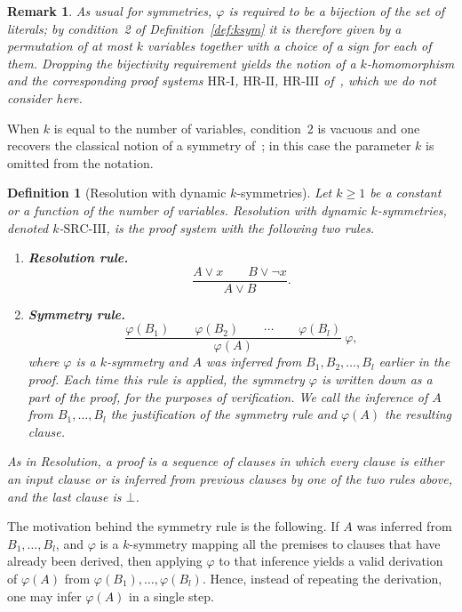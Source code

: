 \documentclass[10pt]{article}
\newtheorem{definition}{Definition}
\newtheorem{remark}[theorem]{Remark}
\newcommand{\SRCIII}{\text{SRC-III}}
\begin{document}
\begin{remark}
As usual for symmetries, $\varphi$ is required to be a bijection of the set of
literals; by condition~2 of Definition~\ref{def:ksym} it is therefore given by
a permutation of at most $k$ variables together with a choice of a sign for
each of them. Dropping the bijectivity requirement yields the notion of a
$k$-homomorphism and the corresponding proof systems
$\text{HR-I}$, $\text{HR-II}$, $\text{HR-III}$ of~\cite{Szeider05}, which we
do not consider here.
\end{remark}

When $k$ is equal to the number of variables, condition~2 is vacuous and one
recovers the classical notion of a symmetry of~\cite{Krishnamurthy85,Urquhart99};
in this case the parameter $k$ is omitted from the notation.

\begin{definition}[Resolution with dynamic $k$-symmetries]\label{def:srciii}
Let $k\ge 1$ be a constant or a function of the number of variables.
\emph{Resolution with dynamic $k$-symmetries}, denoted $k$-$\SRCIII$, is the
proof system with the following two rules.
\begin{enumerate}
    \item \textbf{Resolution rule.}
    \[
    \frac{
    A\lor x
    \qquad
    B\lor\lnot x
    }{
    A\lor B
    }.
    \]
    \item \textbf{Symmetry rule.}
    \[
    \frac{
    \varphi(B_1)
    \qquad
    \varphi(B_2)
    \qquad
    \cdots
    \qquad
    \varphi(B_l)
    }{
    \varphi(A)
    }\ \varphi,
    \]
    where $\varphi$ is a $k$-symmetry and $A$ was inferred from
    $B_1,B_2,\ldots,B_l$ earlier in the proof. Each time this rule is applied,
    the symmetry $\varphi$ is written down as a part of the proof, for the
    purposes of verification. We call the inference of $A$ from
    $B_1,\ldots,B_l$ the \emph{justification} of the symmetry rule and
    $\varphi(A)$ the \emph{resulting clause}.
\end{enumerate}
As in Resolution, a proof is a sequence of clauses in which every clause is
either an input clause or is inferred from previous clauses by one of the two
rules above, and the last clause is $\bot$.
\end{definition}

The motivation behind the symmetry rule is the following. If $A$ was inferred
from $B_1,\ldots,B_l$, and $\varphi$ is a $k$-symmetry mapping all the premises
to clauses that have already been derived, then applying $\varphi$ to that
inference yields a valid derivation of $\varphi(A)$ from
$\varphi(B_1),\ldots,\varphi(B_l)$. Hence, instead of repeating the derivation, one
may infer $\varphi(A)$ in a single step.
\end{document}
